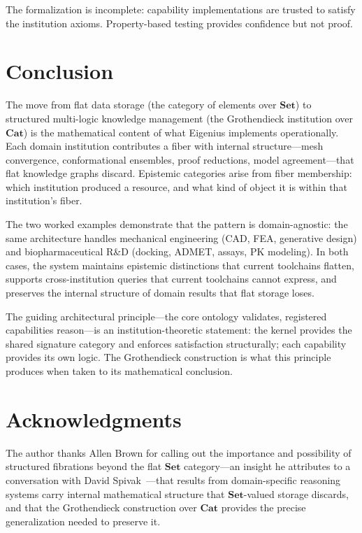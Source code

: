 \documentclass[10pt,twocolumn,letterpaper]{article}
\newcommand{\Cat}{\mathbf{Cat}}
\newcommand{\Set}{\mathbf{Set}}
\begin{document}
The formalization is incomplete: capability implementations are trusted to satisfy the institution axioms.
Property-based testing provides confidence but not proof.

\section{Conclusion}
\label{sec:conclusion}

The move from flat data storage (the category of elements over $\Set$) to structured multi-logic knowledge management (the Grothendieck institution over $\Cat$) is the mathematical content of what Eigenius implements operationally.
Each domain institution contributes a fiber with internal structure---mesh convergence, conformational ensembles, proof reductions, model agreement---that flat knowledge graphs discard.
Epistemic categories arise from fiber membership: which institution produced a resource, and what kind of object it is within that institution's fiber.

The two worked examples demonstrate that the pattern is domain-agnostic: the same architecture handles mechanical engineering (CAD, FEA, generative design) and biopharmaceutical R\&D (docking, ADMET, assays, PK modeling).
In both cases, the system maintains epistemic distinctions that current toolchains flatten, supports cross-institution queries that current toolchains cannot express, and preserves the internal structure of domain results that flat storage loses.

The guiding architectural principle---the core ontology validates, registered capabilities reason---is an institution-theoretic statement: the kernel provides the shared signature category and enforces satisfaction structurally; each capability provides its own logic.
The Grothendieck construction is what this principle produces when taken to its mathematical conclusion.

\section*{Acknowledgments}

The author thanks Allen Brown for calling out the importance and possibility of structured fibrations beyond the flat $\Set$ category---an insight he attributes to a conversation with David Spivak~\cite{spivak2012}---that results from domain-specific reasoning systems carry internal mathematical structure that $\Set$-valued storage discards, and that the Grothendieck construction over $\Cat$ provides the precise generalization needed to preserve it.
\end{document}
